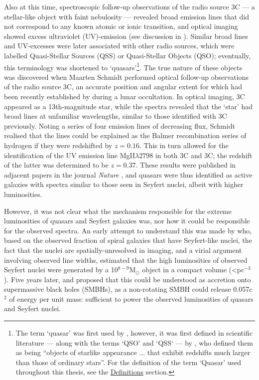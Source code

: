 Also at this time, spectroscopic follow-up observations of the radio source 3C --- a stellar-like object with faint nebulosity --- revealed broad emission lines that did not correspond to any known atomic or ionic transition, and optical imaging showed excess ultraviolet (UV)-emission (see discussion in \citealt{Shields1999}). Similar broad lines and UV-excesses were later associated with other radio sources, which were labelled Quasi-Stellar Sources (QSS) or Quasi-Stellar Objects (QSO); eventually, this terminology was shortened to `quasars'\footnote{The term `quasar' was first used by \citet{Chiu1964}, however, it was first defined in scientific literature --- along with the terms `QSO' and `QSS` --- by \citet{Schmidt1970}, who defined them as being ``objects of starlike appearance ... that exhibit redshifts much larger than those of ordinary stars''. For the definition of the term `Quasar' used throughout this thesis, see the \hyperref[chapter: definitions]{Definitions} section.}. The true nature of these objects was discovered when Maarten Schmidt performed optical follow-up observations of the radio source 3C, an accurate position and angular extent for which had been recently established by \citet{Hazard1963} during a lunar occultation. In optical imaging, 3C appeared as a 13th-magnitude star, while the spectra revealed that the `star' had broad lines at unfamiliar wavelengths, similar to those identified with 3C previously. Noting a series of four emission lines of decreasing flux, Schmidt realised that the lines could be explained as the Balmer recombination series of hydrogen if they were redshifted by $z=0.16$. This in turn allowed for the identification of the UV emission line Mg\;II\;$\lambda2798$ in both 3C and 3C; the redshift of the latter was determined to be $z=0.37$. These results were published in adjacent papers in the journal \textit{Nature} \citep{Hazard1963, Schmidt1963, Oke1963, Greenstein1963}, and quasars were thus identified as active galaxies with spectra similar to those seen in Seyfert nuclei, albeit with higher luminosities.

However, it was not clear what the mechanism responsible for the extreme luminosities of quasars and Seyfert galaxies was, nor how it could be responsible for the observed spectra. An early attempt to understand this was made by \citet{Woltjer1959} who, based on the observed fraction of spiral galaxies that have Seyfert-like nuclei, the fact that the nuclei are spatially-unresolved in imaging, and a virial argument involving observed line widths, estimated that the high luminosities of observed Seyfert nuclei were generated by a 10$^{8-9}$\;M$_\odot$ object in a compact volume (\textless{}\;pc$^{-3}$). Five years later, \citet{Salpeter1964} and \citet{Zeldovich1964} proposed that this could be understood as accretion onto supermassive black holes (SMBHs), as a non-rotating SMBH could release 0.057c$^2$ of energy per unit mass: sufficient to power the observed luminosities of quasars and Seyfert nuclei.

